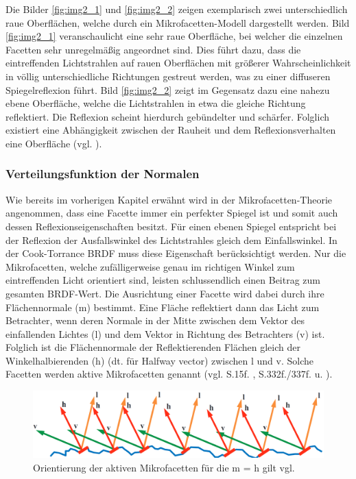\documentclass[
  11pt,
  a4paper,
  oneside
  ]{article}
\begin{document}
Die Bilder \ref{fig:img2_1} und \ref{fig:img2_2} zeigen exemplarisch zwei unterschiedlich raue Oberflächen, welche durch ein Mikrofacetten-Modell dargestellt werden. Bild \ref{fig:img2_1} veranschaulicht eine sehr raue Oberfläche, bei welcher die einzelnen Facetten sehr unregelmäßig angeordnet sind. Dies führt dazu, dass die eintreffenden Lichtstrahlen auf rauen Oberflächen mit größerer Wahrscheinlichkeit in völlig unterschiedliche Richtungen gestreut werden, was zu einer diffuseren Spiegelreflexion führt. Bild \ref{fig:img2_2} zeigt im Gegensatz dazu eine nahezu ebene Oberfläche, welche die Lichtstrahlen in etwa die gleiche Richtung reflektiert. Die Reflexion scheint hierdurch gebündelter und schärfer. Folglich existiert eine Abhängigkeit zwischen der Rauheit und dem Reflexionsverhalten eine Oberfläche 
(vgl. \cite{learnOpenGL}). 

\subsubsection{Verteilungsfunktion der Normalen}\label{sec:ndf}
Wie bereits im vorherigen Kapitel erwähnt wird in der Mikrofacetten-Theorie angenommen, dass eine Facette immer ein perfekter Spiegel ist und somit auch dessen Reflexionseigenschaften besitzt. Für einen ebenen Spiegel entspricht bei der Reflexion der Ausfallswinkel des Lichtstrahles gleich dem Einfallswinkel. In der Cook-Torrance BRDF muss diese Eigenschaft berücksichtigt werden. Nur die Mikrofacetten, welche zufälligerweise genau im richtigen Winkel zum eintreffenden Licht orientiert sind, leisten schlussendlich einen Beitrag zum gesamten BRDF-Wert. Die Ausrichtung einer Facette wird dabei durch ihre Flächennormale (m) bestimmt. Eine Fläche reflektiert dann das Licht zum Betrachter, wenn deren Normale in der Mitte zwischen dem Vektor des einfallenden Lichtes (l) und dem Vektor in Richtung des Betrachters (v) ist. Folglich ist die Flächennormale der Reflektierenden Flächen gleich der Winkelhalbierenden (h) (dt. für Halfway vector) zwischen l und v. Solche Facetten werden aktive Mikrofacetten genannt
(vgl. S.15f. \cite{rtrPaper}, S.332f./337f. \cite{realTimeRendering4th} u. \cite{learnOpenGL}).
\begin{figure}[H]
  \centering
  \includegraphics*[width=0.9 \textwidth]{images/normalDistriFun.png}
  \caption{Orientierung der aktiven Mikrofacetten für die m = h gilt vgl. \cite{learnOpenGL}}
  \label{fig:img7}
\end{figure}
\end{document}
